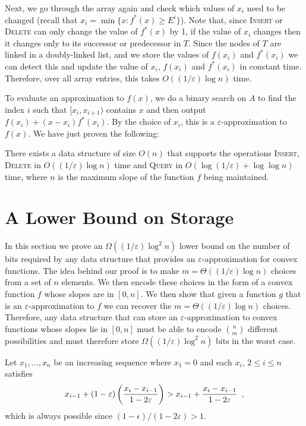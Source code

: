 \documentclass[charterfonts,lotsofwhite]{patmorin}
\newcommand{\eps}{\varepsilon}
\newcommand{\dlt}{2\eps}
\begin{document}
Next, we go through the array again and check which values of $x_i$
need to be changed (recall that $x_i=\min\{x:f^*(x) \ge E^i \}$).
Note that, since \textsc{Insert} or \textsc{Delete} can only change
the value of $f^*(x)$ by 1, if the value of $x_i$ changes then it
changes only to its successor or predecessor in $T$.  Since the nodes
of $T$ are linked in a doubly-linked list, and we store the values of
$f(x_i)$ and $f^*(x_i)$ we can detect this and update the value of
$x_i$, $f(x_i)$ and $f^*(x_i)$ in constant time.  Therefore, over all
array entries, this takes $O((1/\eps) \log n)$ time.

To evaluate an approximation to $f(x)$, we do a binary search on $A$
to find the index $i$ such that $[x_i,x_{i+1})$ contains $x$ and then
output $f(x_i) + (x-x_i)f^*(x_i)$.  By the choice of $x_i$, this is a
$\eps$-approximation to $f(x)$.  We have just proven the
following:

\begin{thm}
There exists a data structure of size $O(n)$ that supports the
operations \textsc{Insert}, \textsc{Delete} in $O((1/\eps) \log n)$
time and \textsc{Query} in $O(\log (1/\eps) + \log \log n)$ time,
where $n$ is the maximum slope of the function $f$ being maintained.
\end{thm}

\section{A Lower Bound on Storage}

In this section we prove an $\Omega((1/\eps)\log^2 n)$
lower bound on the number of bits required by any data structure that
provides an $\eps$-approximation for convex functions.  The idea
behind our proof is to make $m=\Theta((1/\eps) \log n)$ choices from a
set of $n$ elements.  We then encode these choices in the form of a
convex function $f$ whose slopes are in $[0,n]$.  We then show that
given a function $g$ that is an $\eps$-approximation to $f$ we can
recover the $m=\Theta((1/\eps) \log n)$ choices.  Therefore, any data
structure that can store an $\eps$-approximation to convex functions
whose slopes lie in $[0,n]$ must be able to encode $n\choose m$
different possibilities and must therefore store $\Omega((1/\eps)
\log^2 n)$ bits in the worst case.

Let $x_1,\ldots,x_n$ be an increasing sequence where $x_1=0$ and each
$x_i$, $2\le i\le n$ satisfies
\begin{equation}
x_{i-1}+(1-\eps)\left(\frac{x_i-x_{i-1}}{1-\dlt}\right) 
 > x_{i-1}+\frac{x_i-x_{i-1}}{1-\dlt} \enspace , \eqlabel{increasing}
\end{equation}
which is always possible since $(1-\epsilon)/(1-\dlt)>1$.
\end{document}
